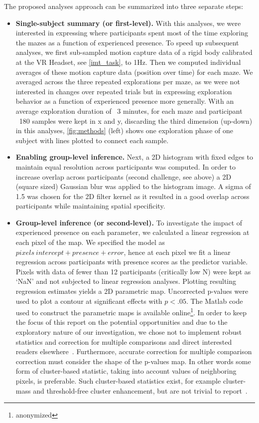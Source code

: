 The proposed analyses approach can be summarized into three separate steps:
\begin{itemize}
    \item \textbf{Single-subject summary (or first-level).} With this analyses, we were interested in expressing where participants spent most of the time exploring the mazes as a function of experienced presence. To speed up subsequent analyses, we first sub-sampled motion capture data of a rigid body calibrated at the VR Headset, see \ref{imt_task}, to 1Hz. Then we computed individual averages of these motion capture data (position over time) for each maze. We averaged across the three repeated explorations per maze, as we were not interested in changes over repeated trials but in expressing exploration behavior as a function of experienced presence more generally. With an average exploration duration of ~3 minutes, for each maze and participant ~180 samples were kept in x and y, discarding the third dimension (up-down) in this analyses, \ref{fig:methods} (left) shows one exploration phase of one subject with lines plotted to connect each sample.
    \item \textbf{Enabling group-level inference.} Next, a 2D histogram with fixed edges to maintain equal resolution across participants was computed. In order to increase overlap across participants (second challenge, see above) a 2D (square sized) Gaussian blur was applied to the histogram image. A sigma of 1.5 was chosen for the 2D filter kernel as it resulted in a good overlap across participants while maintaining spatial specificity.
    \item \textbf{Group-level inference (or second-level).} To investigate the impact of experienced presence on each parameter, we calculated a linear regression at each pixel of the map. We specified the model as $pixels ~ intercept + presence + error$, hence at each pixel we fit a linear regression across participants with presence scores as the predictor variable. Pixels with data of fewer than 12 participants (critically low N) were kept as `NaN' and not subjected to linear regression analyses. Plotting resulting regression estimates yields a 2D parametric map. Uncorrected p-values were used to plot a contour at significant effects with $p < .05$. The Matlab code used to construct the parametric maps is available online\footnote{anonymized}. In order to keep the focus of this report on the potential opportunities and due to the exploratory nature of our investigation, we chose not to implement robust statistics and correction for multiple comparisons and direct interested readers elsewhere~\cite{Pernet2011, Wilcox2016a}. Furthermore, accurate correction for multiple comparison correction must consider the shape of the p-values map. In other words some form of cluster-based statistic, taking into account values of neighboring pixels, is preferable. Such cluster-based statistics exist, for example cluster-mass and threshold-free cluster enhancement, but are not trivial to report~\cite{Pernet2015}.
\end{itemize}
